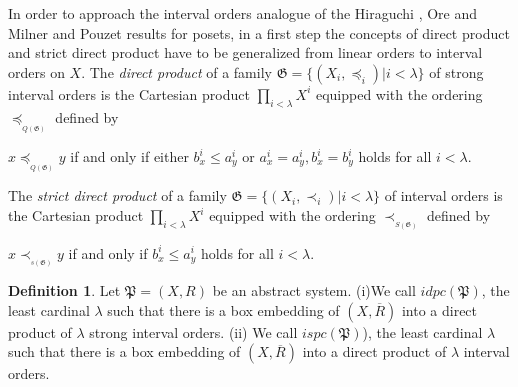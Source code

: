 \documentclass{article}
\theoremstyle{definition}
\newtheorem{definition}{Definition}[section]
\begin{document}
In order to approach the interval orders analogue of the 
Hiraguchi \cite{hir}, Ore \cite{ore} and Milner and Pouzet \cite{MP} results for posets, in a first step the concepts of direct product and strict direct product
have to be generalized from linear orders to interval orders
on $X$. 
The {\it direct product} of a family $\mathfrak{G}=\{(X_i,\preceq_i)\vert i<\lambda\}$
of
strong interval orders is the Cartesian product 
$\displaystyle\prod_{i<\lambda}X^i$ equipped with 
the ordering $\preceq_{_{Q(\mathfrak{G})}}$ defined by 
\begin{center}
$x\preceq_{_{Q(\mathfrak{G})}} y$ if and only if 
either
$b_{x}^{i}\leq a_{y}^{i}$ or $a_{x}^{i}=a_{y}^{i}, b_{x}^{i}=b_{y}^{i}$
holds for all $i<\lambda$.
\end{center} 
The {\it strict direct product} of a family $\mathfrak{G}=\{(X_i,\prec_i)\vert i<\lambda\}$
of
interval orders is the Cartesian product 
$\displaystyle\prod_{i<\lambda}X^i$
equipped with 
the ordering $\prec_{_{S(\mathfrak{G})}}$ defined by 
\begin{center}
$x\prec_{_{s(\mathfrak{G})}} y$ if and only if 
$b_{x}^{i}\leq a_{y}^{i}$
holds for all $i<\lambda$.
\end{center}




















\begin{definition}\label{a127}{\rm Let $\mathfrak{P} = (X, R)$ be an abstract system. (i)We call $idpc(\mathfrak{P})$, the least cardinal $\lambda$ such that there is a box embedding of $(X,\overline{R})$ into a direct product of $\lambda$ strong interval orders.
(ii) 
We call $ispc(\mathfrak{P})$), the least cardinal $\lambda$ such that there is a box embedding of $(X,\overline{R})$ into a direct product of $\lambda$ interval orders.
}
\end{definition}
\end{document}
